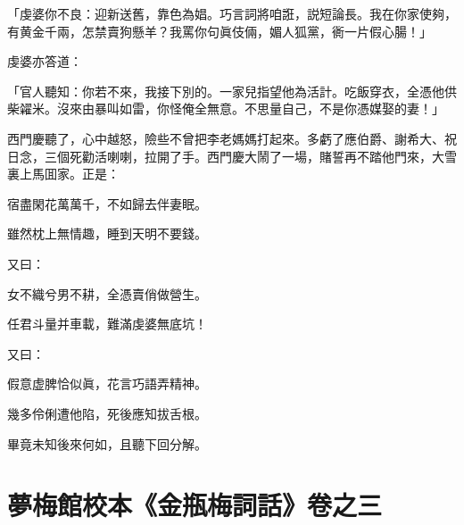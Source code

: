 \begin{myquote}
「虔婆你不良：迎新送舊，靠色為娼。巧言詞將咱誑，説短論長。我在你家使夠，有黄金千兩，怎禁賣狗懸羊？我罵你句眞伎倆，媚人狐黨，衠一片假心腸！」
\end{myquote}

虔婆亦答道：

\begin{myquote}
「官人聽知：你若不來，我接下別的。一家兒指望他為活計。吃飯穿衣，全憑他供柴糴米。沒來由暴叫如雷，你怪俺全無意。不思量自己，不是你憑媒娶的妻！」
\end{myquote}

西門慶聽了，心中越怒，險些不曾把李老媽媽打起來。多虧了應伯爵、謝希大、祝日念，三個死勸活喇喇，拉開了手。西門慶大鬧了一場，賭誓再不踏他門來，大雪裏上馬囬家。正是：

\begin{myquote}
宿盡閑花萬萬千，不如歸去伴妻眠。

雖然枕上無情趣，睡到天明不要錢。
\end{myquote}

又曰：

\begin{myquote}
女不織兮男不耕，全憑賣俏做營生。

任君斗量并車載，難滿虔婆無底坑！
\end{myquote}

又曰：

\begin{myquote}
假意虚脾恰似眞，花言巧語弄精神。

幾多伶俐遭他陷，死後應知拔舌根。
\end{myquote}

畢竟未知後來何如，且聽下回分解。

\part*{夢梅館校本《金瓶梅詞話》卷之三}

